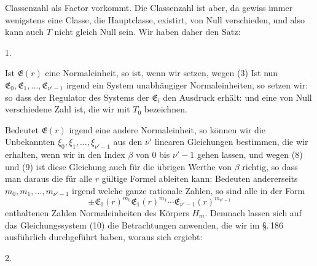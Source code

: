 Classenzahl als Factor vorkommt. Die Classenzahl ist aber, da
gewiss immer wenigstens eine Classe, die Hauptclasse, existirt,
von Null verschieden, und also kann auch $T$ nicht gleich Null
sein. Wir haben daher den Satz:

1. 

Ist $\mathfrak{E}(r)$ eine Normaleinheit, so ist, wenn wir
setzen, wegen (3)
Ist nun $\mathfrak{E}_0, \mathfrak{E}_1, \ldots, \mathfrak{E}_{\nu'-1}$ irgend ein System unabhängiger
Normaleinheiten, so setzen wir:
so dass der Regulator des Systems der $\mathfrak{E}_i$ den Ausdruck erhält:
und eine von Null verschiedene Zahl ist, die wir mit $T_0$ bezeichnen.

Bedeutet $\mathfrak{E}(r)$ irgend eine andere Normaleinheit, so können
wir die Unbekannten $\xi_0, \xi_1, \ldots, \xi_{\nu'-1}$ aus den $\nu'$ linearen Gleichungen
 bestimmen, die wir erhalten, wenn wir in
den Index $\beta$ von 0 bis $\nu'-1$ gehen lassen, und wegen (8) und (9)
ist diese Gleichung auch für die übrigen Werthe von $\beta$ richtig,
so dass man daraus die für alle $r$ gültige Formel ableiten kann:
Bedeuten andererseits $m_0, m_1, \ldots, m_{\nu'-1}$ irgend welche ganze
rationale Zahlen, so sind alle in der Form
\[
\pm\mathfrak{E}_0(r)^{m_0}\mathfrak{E}_1(r)^{m_1}\cdots\mathfrak{E}_{\nu'-1}(r)^{m_{\nu'-1}}
\]
enthaltenen Zahlen Normaleinheiten des Körpers $H_m$. Demnach
lassen sich auf das Gleichungssystem (10) die Betrachtungen
anwenden, die wir im \S.\,186 ausführlich durchgeführt haben,
woraus sich ergiebt:

2. 

